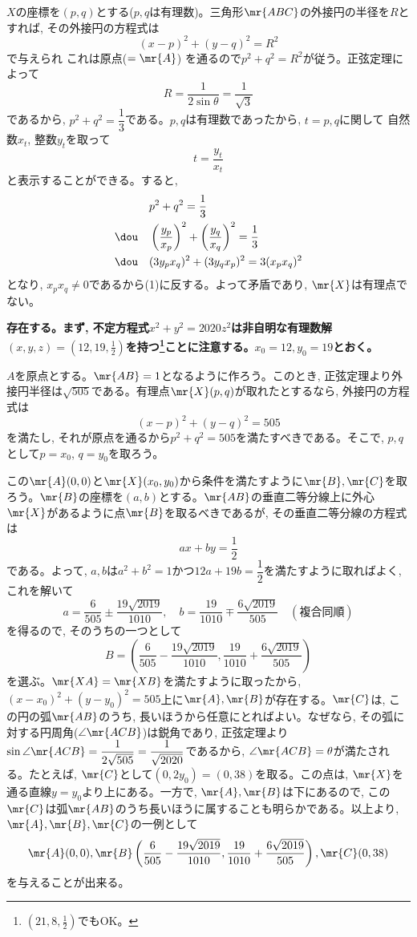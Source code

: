 $X$の座標を$(p,q)$とする($p,q$は有理数)。三角形$\mr{ABC}$の外接円の半径を$R$とすれば, その外接円の方程式は
\[(x-p)^2 + (y-q)^2 = R^2\]
で与えられ これは原点($=\mr{A}$) を通るので$p^2 + q^2 = R^2$が従う。正弦定理によって
\[R = \dfrac{1}{2\sin{\theta}} = \dfrac{1}{\sqrt{3}}\]
であるから, $p^2 + q^2 = \dfrac{1}{3}$である。$p,q$は有理数であったから, $t=p,q$に関して 自然数$x_t$, 整数$y_t$を取って
\[t = \dfrac{y_t}{x_t}\]
と表示することができる。すると, 
\begin{align*}
 & p^2+q^2 = \dfrac{1}{3} \\
 \dou\quad & \left(\frac{y_p}{x_p}\right)^2 + \left(\frac{y_q}{x_q}\right)^2 = \dfrac{1}{3}\\
 \dou\quad & (3y_px_q)^2 + (3y_qx_p)^2 = 3(x_px_q)^2
\end{align*}
となり, $x_px_q \neq 0$であるから(1)に反する。よって矛盾であり, $\mr{X}$は有理点でない。

\bf{存在する。}まず, 不定方程式$x^2 + y^2 = 2020z^2$は非自明な有理数解$(x,y,z) = (12,19,\frac{1}{2})$を持つ\footnote{$(21,8,\frac{1}{2})$でもOK。}ことに注意する。$x_0=12, y_0=19$とおく。

$A$を原点とする。$\mr{AB} = 1$となるように作ろう。このとき, 正弦定理より外接円半径は$\sqrt{505}$である。有理点$\mr{X}(p,q)$が取れたとするなら, 外接円の方程式は
\[(x-p)^2 + (y-q)^2 = 505\]
を満たし, それが原点を通るから$p^2 + q^2 = 505$を満たすべきである。そこで, $p,q$として$p=x_0$, $q=y_0$を取ろう。

この$\mr{A}(0,0)$と$\mr{X}(x_0,y_0)$から条件を満たすように$\mr{B},\mr{C}$を取ろう。$\mr{B}$の座標を$(a,b)$とする。$\mr{AB}$の垂直二等分線上に外心$\mr{X}$があるように点$\mr{B}$を取るべきであるが, その垂直二等分線の方程式は
\[ax+by = \dfrac{1}{2}\]
である。よって, $a,b$は$a^2 + b^2 = 1$かつ$12a + 19b=\dfrac{1}{2}$を満たすように取ればよく, これを解いて
\[a= \frac{6}{505} \pm \frac{19\sqrt{2019}}{1010},\quad b=\frac{19}{1010}\mp \frac{6\sqrt{2019}}{505}\quad (複合同順)\]
を得るので, そのうちの一つとして
\[B = \left(\frac{6}{505} - \frac{19\sqrt{2019}}{1010},\frac{19}{1010}+ \frac{6\sqrt{2019}}{505}\right) \]
を選ぶ。$\mr{XA} = \mr{XB}$を満たすように取ったから, $(x-x_0)^2 + (y-y_0)^2 = 505$上に$\mr{A},\mr{B}$が存在する。$\mr{C}$は, この円の弧$\mr{AB}$のうち, 長いほうから任意にとればよい。なぜなら, その弧に対する円周角($\angle{\mr{ACB}}$)は鋭角であり, 正弦定理より$\sin{\angle{\mr{ACB}}} = \dfrac{1}{2\sqrt{505}} =\dfrac{1}{\sqrt{2020}}$であるから, $\angle{\mr{ACB}} = \theta$が満たされる。たとえば, $\mr{C}$として$(0,2y_0) = (0,38)$を取る。この点は, $\mr{X}$を通る直線$y=y_0$より上にある。一方で, $\mr{A},\mr{B}$は下にあるので, この$\mr{C}$は弧$\mr{AB}$のうち長いほうに属することも明らかである。以上より, $\mr{A},\mr{B},\mr{C}$の一例として
\[ \mr{A}(0,0), \mr{B}\left(\dfrac{6}{505} - \dfrac{19\sqrt{2019}}{1010},\dfrac{19}{1010}+ \dfrac{6\sqrt{2019}}{505}\right), \mr{C}(0,38)\]
を与えることが出来る。

